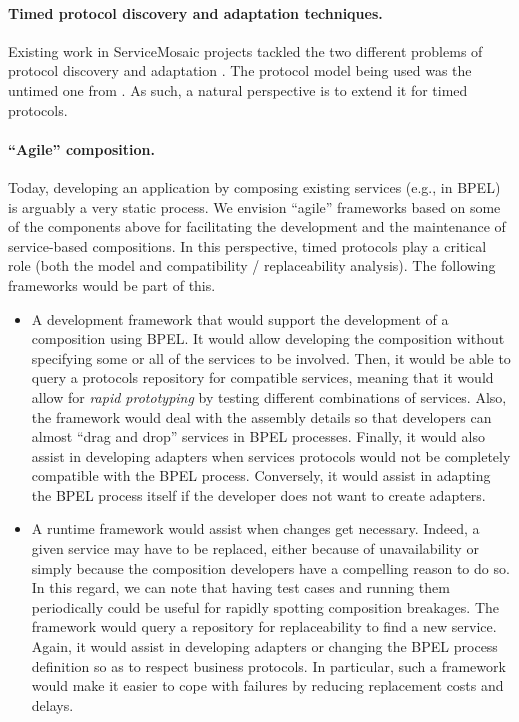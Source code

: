 \paragraph{Timed protocol discovery and adaptation techniques.}
Existing work in ServiceMosaic projects tackled the two different problems of protocol discovery and adaptation \cite{Motahari-NezhadSBC07,BenatallahCGNT05,MBMCC-WWW07}. The protocol model being used was the untimed one from \cite{FTBB}. As such, a natural perspective is to extend it for timed protocols.

\paragraph{``Agile'' composition.}
Today, developing an application by composing existing services (e.g., in BPEL) is arguably a very static process. We envision ``agile'' frameworks based on some of the components above for facilitating the development and the maintenance of service-based compositions. In this perspective, timed protocols play a critical role (both the model and compatibility / replaceability analysis). The following frameworks would be part of this.
\begin{itemize}
  
  \item A development framework that would support the development of a composition using BPEL. It would allow developing the composition without specifying some or all of the services to be involved. Then, it would be able to query a protocols repository for compatible services, meaning that it would allow for \emph{rapid prototyping} by testing different combinations of services. Also, the framework would deal with the assembly details so that developers can almost ``drag and drop'' services in BPEL processes. Finally, it would also assist in developing adapters when services protocols would not be completely compatible with the BPEL process. Conversely, it would assist in adapting the BPEL process itself if the developer does not want to create adapters.
  
  \item A runtime framework would assist when changes get necessary. Indeed, a given service may have to be replaced, either because of unavailability or simply because the composition developers have a compelling reason to do so. In this regard, we can note that having test cases and running them periodically could be useful for rapidly spotting composition breakages. The framework would query a repository for replaceability to find a new service. Again, it would assist in developing adapters or changing the BPEL process definition so as to respect business protocols. In particular, such a framework would make it easier to cope with failures by reducing replacement costs and delays.
  
\end{itemize}

